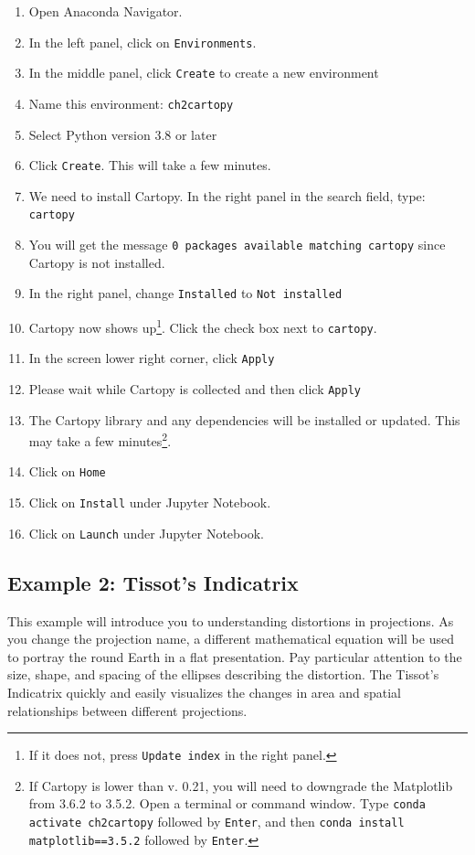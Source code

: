 \documentclass[a4paper , 12pt]{book}
\newcommand{\code}[1]{\colorbox{light-gray}{\texttt{#1}}}
\begin{document}
\begin{enumerate}
    \item Open Anaconda Navigator.
    \item In the left panel, click on \code{Environments}.
    \item In the middle panel, click \code{Create} to create a new environment
    \item Name this environment: \code{ch2cartopy}
    \item Select Python version 3.8 or later
    \item Click \code{Create}. This will take a few minutes.
    \item We need to install Cartopy. In the right panel in the search field, type: \code{cartopy}
    \item You will get the message \code{0 packages available matching cartopy} since Cartopy is not installed.
    \item In the right panel, change \code{Installed} to \code{Not installed}
    \item Cartopy now shows up\footnote{If it does not, press \code{Update index} in the right panel.}. Click the check box next to \code{cartopy}.
    \item In the screen lower right corner, click \code{Apply}
    \item Please wait while Cartopy is collected and then click \code{Apply}
    \item The Cartopy library and any dependencies will be installed or updated. This may take a few minutes\footnote{If Cartopy is lower than v. 0.21, you will need to downgrade the Matplotlib from 3.6.2 to 3.5.2. Open a terminal or command window. Type \code{conda activate ch2cartopy} followed by \code{Enter}, and then \code{conda install matplotlib==3.5.2} followed by \code{Enter}.}. 
    \item Click on \code{Home}
    \item Click on \code{Install} under Jupyter Notebook.
    \item Click on \code{Launch} under Jupyter Notebook.
   
\end{enumerate}

\subsection*{Example 2: Tissot's Indicatrix}

This example will introduce you to understanding distortions in projections. As you change the projection name, a different mathematical equation will be used to portray the round Earth in a flat presentation. Pay particular attention to the size, shape, and spacing of the ellipses describing the distortion. The Tissot’s Indicatrix quickly and easily visualizes the changes in area and spatial relationships between different projections.
\end{document}
